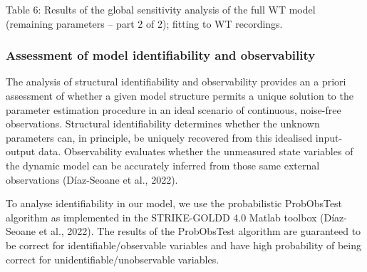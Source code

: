 \documentclass[
  11pt,
  letterpaper,
  DIV=11,
  numbers=noendperiod]{scrartcl}
\begin{document}
Table 6: Results of the global sensitivity analysis of the full WT model
(remaining parameters -- part 2 of 2); fitting to WT recordings.

\subsubsection{Assessment of model identifiability and
observability}\label{assessment-of-model-identifiability-and-observability}

The analysis of structural identifiability and observability provides an
a priori assessment of whether a given model structure permits a unique
solution to the parameter estimation procedure in an ideal scenario of
continuous, noise-free observations. Structural identifiability
determines whether the unknown parameters can, in principle, be uniquely
recovered from this idealised input-output data. Observability evaluates
whether the unmeasured state variables of the dynamic model can be
accurately inferred from those same external observations (Díaz-Seoane
et al., 2022).

To analyse identifiability in our model, we use the probabilistic
ProbObsTest algorithm as implemented in the STRIKE-GOLDD 4.0 Matlab
toolbox (Díaz-Seoane et al., 2022). The results of the ProbObsTest
algorithm are guaranteed to be correct for identifiable/observable
variables and have high probability of being correct for
unidentifiable/unobservable variables.
\end{document}

